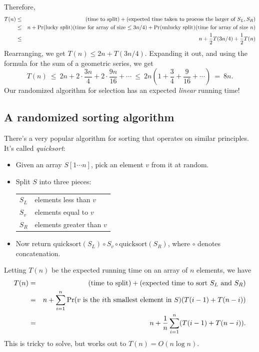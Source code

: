 Therefore,
\begin{eqnarray*}
T(n) 
& \leq &
\mbox{(time to split)} + \mbox{(expected time taken to process the larger of $S_L, S_R$)} \\
& \leq &
n + \mbox{\rm Pr}{\mbox{(lucky split)}} \mbox{(time for array of size $\leq 3n/4$)}
 + \mbox{\rm Pr}{\mbox{(unlucky split)}} \mbox{(time for array of size $n$)} \\
& \leq &
n + \frac{1}{2} T(3n/4) + \frac{1}{2} T(n)
\end{eqnarray*}
Rearranging, we get $T(n) \leq 2n + T(3n/4)$. Expanding it out, and using the formula
for the sum of a geometric series, we get
$$
T(n) 
\ \leq \ 
2n + 2 \cdot \frac{3n}{4} + 2 \cdot \frac{9n}{16} + \cdots 
\ \leq \ 
2n \left( 1 + \frac{3}{4} + \frac{9}{16} + \cdots \right) 
\ = \  
8n.
$$
Our randomized algorithm for selection has an expected {\it linear} running time!

\subsection{A randomized sorting algorithm}

There's a very popular algorithm for sorting that operates on similar principles.
It's called {\it quicksort}:
\begin{itemize}
\item Given an array $S[1\cdots n]$, pick an element $v$ from it at random.
\item Split $S$ into three pieces: 

\begin{center}
\begin{tabular}{ll}
$S_L$ & elements less than $v$ \\
$S_v$ & elements equal to $v$ \\ 
$S_R$ & elements greater than $v$
\end{tabular}
\end{center}

\item Now return $\mbox{quicksort}(S_L) \circ S_v \circ \mbox{quicksort}(S_R)$, 
where $\circ$ denotes concatenation. 
\end{itemize}

Letting $T(n)$ be the expected running time on an array of $n$ elements, we have
\begin{eqnarray*}
T(n) 
& = & \mbox{(time to split)} + \mbox{(expected time to sort $S_L$ and $S_R$)} \\
& = & n + \sum_{i=1}^n \mbox{\rm Pr}(\mbox{$v$ is the $i$th smallest element in $S$}) (T(i-1) + T(n-i)) \\
& = & n + \frac{1}{n} \sum_{i=1}^n (T(i-1) + T(n-i)) .
\end{eqnarray*}
This is tricky to solve, but works out to $T(n) = O(n \log n)$.

